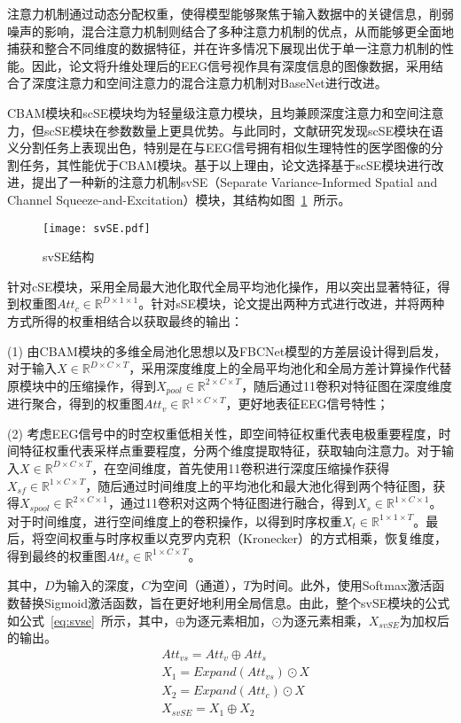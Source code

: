 注意力机制通过动态分配权重，使得模型能够聚焦于输入数据中的关键信息，削弱噪声的影响，混合注意力机制则结合了多种注意力机制的优点，从而能够更全面地捕获和整合不同维度的数据特征，并在许多情况下展现出优于单一注意力机制的性能。因此，论文将升维处理后的EEG信号视作具有深度信息的图像数据，采用结合了深度注意力和空间注意力的混合注意力机制对BaseNet进行改进。

CBAM模块和scSE模块均为轻量级注意力模块，且均兼顾深度注意力和空间注意力，但scSE模块在参数数量上更具优势。与此同时，文献\cite{roy2018concurrent}研究发现scSE模块在语义分割任务上表现出色，特别是在与EEG信号拥有相似生理特性的医学图像的分割任务，其性能优于CBAM模块。基于以上理由，论文选择基于scSE模块进行改进，提出了一种新的注意力机制svSE（Separate Variance-Informed Spatial and Channel Squeeze-and-Excitation）模块，其结构如图~\ref{fig:svSE}~所示。
\begin{figure}
    \centering
    \texttt{[image: svSE.pdf]}
    \caption{svSE结构}
    \label{fig:svSE}
\end{figure}

针对cSE模块，采用全局最大池化取代全局平均池化操作，用以突出显著特征，得到权重图\(Att_c \in \mathbb{R}^{D \times 1 \times 1}\)。针对sSE模块，论文提出两种方式进行改进，并将两种方式所得的权重相结合以获取最终的输出：

(1) 由CBAM模块的多维全局池化思想以及FBCNet模型的方差层设计\cite{mane2021fbcnet}得到启发，对于输入\(X \in \mathbb{R}^{D \times C \times T}\)，采用深度维度上的全局平均池化和全局方差计算操作代替原模块中的压缩操作，得到\(X_{pool} \in \mathbb{R}^{2 \times C \times T}\)，随后通过1\times1卷积对特征图在深度维度进行聚合，得到的权重图\(Att_v \in \mathbb{R}^{1 \times C \times T}\)，更好地表征EEG信号特性；

(2) 考虑EEG信号中的时空权重低相关性，即空间特征权重代表电极重要程度，时间特征权重代表采样点重要程度，分两个维度提取特征，获取轴向注意力。对于输入\(X \in \mathbb{R}^{D \times C \times T}\)，在空间维度，首先使用1\times1卷积进行深度压缩操作获得\(X_{sf} \in \mathbb{R}^{1 \times C \times T}\)，随后通过时间维度上的平均池化和最大池化得到两个特征图，获得\(X_{spool} \in \mathbb{R}^{2 \times C \times 1}\)，通过1\times1卷积对这两个特征图进行融合，得到\(X_s \in \mathbb{R}^{1 \times C \times 1}\)。对于时间维度，进行空间维度上的卷积操作，以得到时序权重\(X_t \in \mathbb{R}^{1 \times 1 \times T}\)。最后，将空间权重与时序权重以克罗内克积（Kronecker）的方式相乘，恢复维度，得到最终的权重图\(Att_s \in \mathbb{R}^{1 \times C \times T}\)。

其中，\(D\)为输入的深度，\(C\)为空间（通道），\(T\)为时间。此外，使用Softmax激活函数替换Sigmoid激活函数，旨在更好地利用全局信息。由此，整个svSE模块的公式如公式~\ref{eq:svse}~所示，其中，\(\oplus\)为逐元素相加，\(\odot\)为逐元素相乘，\(X_{svSE}\)为加权后的输出。
\begin{equation}\label{eq:svse}
    \begin{aligned}
        &Att_{vs}=Att_v \oplus Att_s \\
        &X_1=Expand(Att_{vs}) \odot X \\
        &X_2=Expand(Att_c) \odot X \\
        &X_{svSE}=X_1 \oplus X_2
    \end{aligned}
\end{equation}

